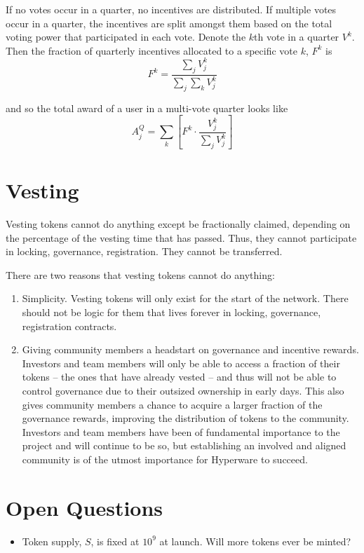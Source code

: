\documentclass{article}
\begin{document}
If no votes occur in a quarter, no incentives are distributed.
If multiple votes occur in a quarter, the incentives are split amongst them based on the total voting power that participated in each vote.
Denote the $k$th vote in a quarter $V^{k}$.
Then the fraction of quarterly incentives allocated to a specific vote $k$, $F^{k}$ is
\begin{equation}
F^{k} = \frac{\sum_j V^{k}_j}{\sum_j \sum_k V^{k}_j}
\end{equation}

and so the total award of a user in a multi-vote quarter looks like
\begin{equation}
A^{Q}_j = \sum_k \left[F^{k} \cdot \frac{V^{k}_j}{\sum_j V^{k}_j}\right]
\end{equation}

\section{Vesting}\label{sec:vesting}

Vesting tokens cannot do anything except be fractionally claimed, depending on the percentage of the vesting time that has passed.
Thus, they cannot participate in locking, governance, registration.
They cannot be transferred.

There are two reasons that vesting tokens cannot do anything:
\begin{enumerate}
    \item Simplicity.
       Vesting tokens will only exist for the start of the network.
       There should not be logic for them that lives forever in locking, governance, registration contracts.
    \item Giving community members a headstart on governance and incentive rewards.
       Investors and team members will only be able to access a fraction of their tokens -- the ones that have already vested -- and thus will not be able to control governance due to their outsized ownership in early days.
       This also gives community members a chance to acquire a larger fraction of the governance rewards, improving the distribution of tokens to the community.
       Investors and team members have been of fundamental importance to the project and will continue to be so, but establishing an involved and aligned community is of the utmost importance for Hyperware to succeed.
\end{enumerate}

\section{Open Questions}\label{sec:questions}
\begin{itemize}
    \item Token supply, $S$, is fixed at $10^9$ at launch.
      Will more tokens ever be minted?
\end{itemize}
\end{document}
